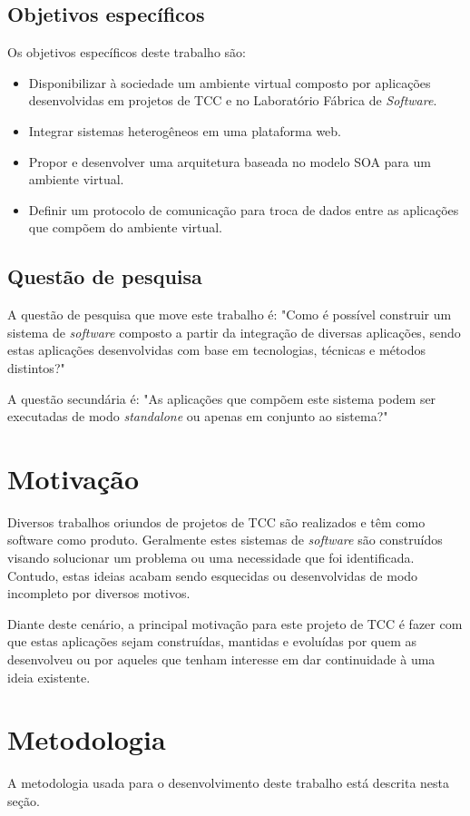 \subsection{Objetivos específicos}
Os objetivos específicos deste trabalho são:
\begin{itemize}
\item Disponibilizar à sociedade um ambiente virtual composto por aplicações desenvolvidas em projetos de TCC e no Laboratório Fábrica de \textit{Software}.
\item Integrar sistemas heterogêneos em uma plataforma web.
\item Propor e desenvolver uma arquitetura baseada no modelo SOA para um ambiente virtual.
\item Definir um protocolo de comunicação para troca de dados entre as aplicações que compõem do ambiente virtual.
\end{itemize}

\subsection{Questão de pesquisa}
A questão de pesquisa que move este trabalho é: "Como é possível construir um sistema de \textit{software} composto a partir da integração de diversas aplicações, sendo estas aplicações desenvolvidas com base em tecnologias, técnicas e métodos distintos?"

A questão secundária é: "As aplicações que compõem este sistema podem ser executadas de modo \textit{standalone} ou apenas em conjunto ao sistema?"

\section{Motivação}
Diversos trabalhos oriundos de projetos de TCC são realizados e têm como software como produto. Geralmente estes sistemas de \textit{software} são construídos visando solucionar um problema ou uma necessidade que foi identificada. Contudo, estas ideias acabam sendo esquecidas ou desenvolvidas de modo incompleto por diversos motivos.

Diante deste cenário, a principal motivação para este projeto de TCC é fazer com que estas aplicações sejam construídas, mantidas e evoluídas por quem as desenvolveu ou por aqueles que tenham interesse em dar continuidade à uma ideia existente.

\section{Metodologia}
A metodologia usada para o desenvolvimento deste trabalho está descrita nesta seção. 

